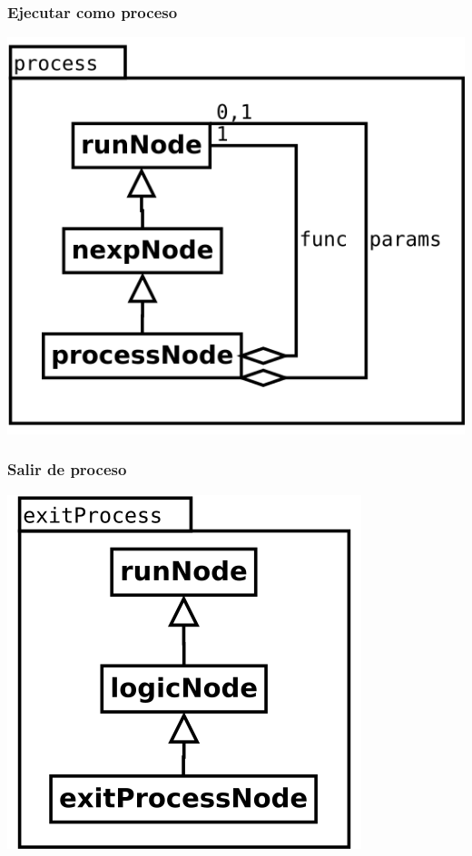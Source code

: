 \begin{multicols}{2}
   \subsubsection {Ejecutar como proceso} 
   \begin{center}
   \includegraphics[scale=0.4]{process.png} \\
   \end{center}
\columnbreak
   \subsubsection {Salir de proceso} 
   \begin{center}
   \includegraphics[scale=0.4]{exitProcess.png} \\
   \end{center}
\end{multicols}


